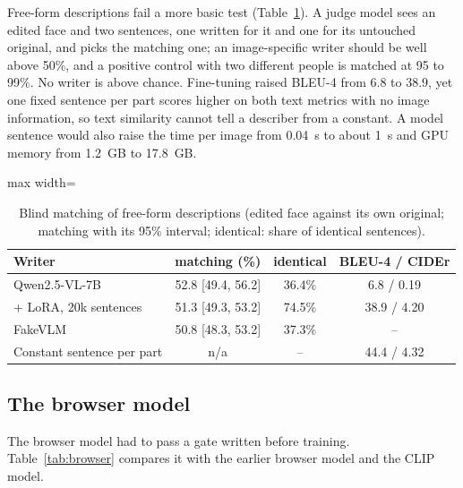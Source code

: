 \documentclass[conference,a4paper]{IEEEtran}
\begin{document}
Free-form descriptions fail a more basic test (Table~\ref{tab:vlm}). A judge model sees an edited face and two sentences, one
written for it and one for its untouched original, and picks the matching one; an image-specific writer should be well above
50\%, and a positive control with two different people is matched at 95 to 99\%. No writer is above chance. Fine-tuning raised
BLEU-4 from 6.8 to 38.9, yet one fixed sentence per part scores higher on both text metrics with no image information, so text
similarity cannot tell a describer from a constant. A model sentence would also raise the time per image from 0.04~s to about
1~s and GPU memory from 1.2~GB to 17.8~GB.

\begin{table}[!htb]
\centering
\caption{Blind matching of free-form descriptions (edited face against its own original; matching with its 95\% interval;
identical: share of identical sentences).}
\label{tab:vlm}
\footnotesize
\begin{adjustbox}{max width=\columnwidth}
\begin{tabular}{@{}lccc@{}}
\toprule
Writer & matching (\%) & identical & BLEU-4 / CIDEr \\
\midrule
Qwen2.5-VL-7B & 52.8 [49.4, 56.2] & 36.4\% & 6.8 / 0.19 \\
\quad + LoRA, 20k sentences & 51.3 [49.3, 53.2] & 74.5\% & 38.9 / 4.20 \\
FakeVLM~\cite{fakevlm2025} & 50.8 [48.3, 53.2] & 37.3\% & -- \\
Constant sentence per part & n/a & -- & 44.4 / 4.32 \\
\bottomrule
\end{tabular}
\end{adjustbox}
\end{table}

\subsection{The browser model}
\label{sec:res-browser}

The browser model had to pass a gate written before training. Table~\ref{tab:browser} compares it with the earlier browser
model and the CLIP model.
\end{document}

